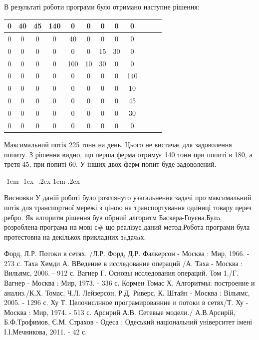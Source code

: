 \documentclass[a4paper,14pt,russian,ukrainian,oneside,final]{extreport}
\makeatletter
\newlength{\fivecharsapprox}
\newlength{\fivecharsapproxs}
\renewcommand\section{%
  \clearpage\@startsection {section}{0}%
    {\fivecharsapproxs}%
    {-1em \@plus -1ex \@minus -.2ex}%
    {1em \@plus .2ex}%
    {\raggedright\hyphenpenalty=10000\normalfont\large\bfseries\MakeUppercase {}}
}
\newcommand\sectioncentered{%
  \clearpage\@startsection {section}{1}%
    {\z@}%
    {-1em \@plus -1ex \@minus -.2ex}%
    {1em \@plus .2ex}%
    {\centering\hyphenpenalty=10000\normalfont\large\bfseries\MakeUppercase}%
    }
\makeatother
\begin{document}
\indent В результаті роботи програми було отримано наступне рішення:
\begin{center}
\begin{tabular}{|c|c|c|c|c|c|c|c|c|c|c|c|}
\hline
0&40&45&140&0&0&0&0&0 \\ \hline
0&0&0&0&40&0&0&0&0 \\ \hline
0&0&0&0&0&0&15&30&0 \\ \hline
0&0&0&0&100&10&30&0&0 \\ \hline
0&0&0&0&0&0&0&0&140 \\ \hline
0&0&0&0&0&0&0&0&10 \\ \hline
0&0&0&0&0&0&0&0&45 \\ \hline
0&0&0&0&0&0&0&0&30 \\ \hline
0&0&0&0&0&0&0&0&0 \\ \hline
\end{tabular}
\end{center}
Максимальний потік 225 тонн на день. 
Цього не вистачає для задоволення попиту. 
З рішення видно, що перша ферма отримує 140 тонн при попиті в 180, а третя 45, при попиті 60. 
У інших двох ферм попит буде задоволений.

\newpage
\section{Висновки}
У даній роботі було розглянуто узагальнення задачі про максимальний потік для транспортної мережі з ціною на транспортування одиниці товару церез ребро. Як алгоритм рішення був обрний алгоритм Баскера-Гоуєна.Булa розроблена програма на мові с\# що реалізує даний метод.Робота програми була протестовна на декількох прикладних зaдачaх.

\newpage
\renewcommand{\bibsection}{\sectioncentered*{Cписок використанної літератури}}

\begin{thebibliography}{99}
 Форд, Л.Р. Потоки в сетях. /Л.Р. Форд, Д.Р. Фалкерсон - Москва : Мир, 1966. - 273 с.
 Таха Хемди А. ВВедение в исследование операций /А. Таха - Москва : Вильямс, 2006. - 912 с.
Вагнер Г. Основы исследования операций. Том 1./Г. Вагнер - Москва : Мир, 1973. - 336 с.
Кормен Томас Х. Алгоритмы: построение и анализ./К.Х. Томас, Ч.Л. Лейзерсон, Р.Д. Риверс, К. Штайн - Москва : Вільямс, 2005. - 1296 с.
 Ху Т. Целочислнное програмированние и потоки в сетях/Т. Ху - Москва : Мир, 1974. - 513 с.
 Арсирий А.В. Сетевые модели./ А.В.Арсирій, Б.Ф.Трофимов, Є.М. Страхов - Одеса : Одеський національний університет імені І.І.Мечникова, 2011. - 42 с.
\end{thebibliography}
\end{document}
